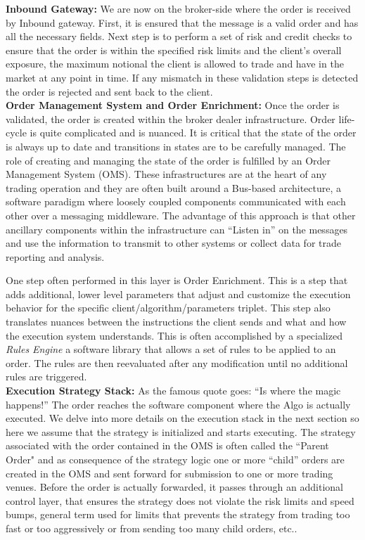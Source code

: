\noindent\textbf{Inbound Gateway:} We are now on the broker-side where the order is received by Inbound gateway. First, it is ensured that the message is a valid order and has all the necessary fields. Next step is to perform a set of risk and credit checks to ensure that the order is within the specified risk limits and the client's overall exposure, the maximum notional the client is allowed to trade and have in the market at any point in time. If any mismatch in these validation steps is detected the order is rejected and sent back to the client. \\


\noindent\textbf{Order Management System and Order Enrichment:} Once the order is validated, the order is created within the broker dealer infrastructure. Order life-cycle is quite complicated and is nuanced. It is critical that the state of the order is always up to date and transitions in states are to be carefully managed. The role of creating and managing the state of the order is fulfilled by an Order Management System (OMS). These infrastructures are at the heart of any trading operation and they are often built around a Bus-based architecture, a software paradigm where loosely coupled components communicated with each other over a messaging middleware. The advantage of this approach is that other ancillary components within the infrastructure can ``Listen in'' on the messages and use the information to transmit to other systems or collect data for trade reporting and analysis.


One step often performed in this layer is Order Enrichment. This is a step that adds additional, lower level parameters that adjust and customize the execution behavior for the specific client/algorithm/parameters triplet. This step also translates nuances between the instructions the client sends and what and how the execution system understands. This is often accomplished by a specialized \emph{Rules Engine} a software library that allows a set of rules to be applied to an order. The rules are then reevaluated after any modification until no additional rules are triggered. \\


\noindent\textbf{Execution Strategy Stack:} As the famous quote goes: ``Is where the magic happens!'' The order reaches the software component where the Algo is actually executed. We delve into more details on the execution stack in the next section so here we assume that the strategy is initialized and starts executing. The strategy associated with the order contained in the OMS is often called the ``Parent Order" and as consequence of the strategy logic one or more ``child'' orders  are created in the OMS and sent forward for submission to one or more trading venues. Before the order is actually forwarded, it passes through an additional control layer, that ensures the strategy does not violate the risk limits and speed bumps, general term used for limits that prevents the strategy from trading too fast or too aggressively or from sending too many child orders, etc.. \\


